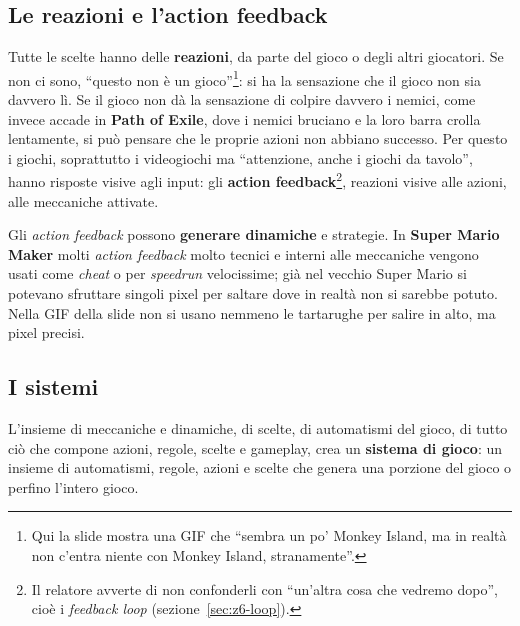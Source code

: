 \subsection{Le reazioni e l'action feedback}

Tutte le scelte hanno delle \textbf{reazioni}, da parte del gioco o degli altri
giocatori. Se non ci sono, ``questo non è un gioco''\footnote{Qui la slide mostra
una GIF che ``sembra un po' Monkey Island, ma in realtà non c'entra niente con
Monkey Island, stranamente''.}: si ha la sensazione che il gioco non sia davvero
lì. Se il gioco non dà la sensazione di colpire davvero i nemici, come invece
accade in \textbf{Path of Exile}, dove i nemici bruciano e la loro barra
crolla lentamente, si può pensare che le proprie azioni non abbiano successo.
Per questo i giochi, soprattutto i videogiochi ma ``attenzione, anche i giochi da
tavolo'', hanno risposte visive agli input: gli \textbf{action
feedback}\footnote{Il relatore avverte di non confonderli con ``un'altra cosa
che vedremo dopo'', cioè i \emph{feedback loop}
(sezione~\ref{sec:z6-loop}).}, reazioni visive alle azioni, alle meccaniche
attivate.

Gli \emph{action feedback} possono \textbf{generare dinamiche} e strategie. In
\textbf{Super Mario Maker} molti \emph{action feedback} molto tecnici e interni
alle meccaniche vengono usati come \emph{cheat} o per \emph{speedrun}
velocissime; già nel vecchio Super Mario si potevano sfruttare singoli pixel per
saltare dove in realtà non si sarebbe potuto. Nella GIF della slide non si usano
nemmeno le tartarughe per salire in alto, ma pixel precisi.

\subsection{I sistemi}

L'insieme di meccaniche e dinamiche, di scelte, di automatismi del gioco, di
tutto ciò che compone azioni, regole, scelte e gameplay, crea un \textbf{sistema
di gioco}: un insieme di automatismi, regole, azioni e scelte che genera una
porzione del gioco o perfino l'intero gioco.

